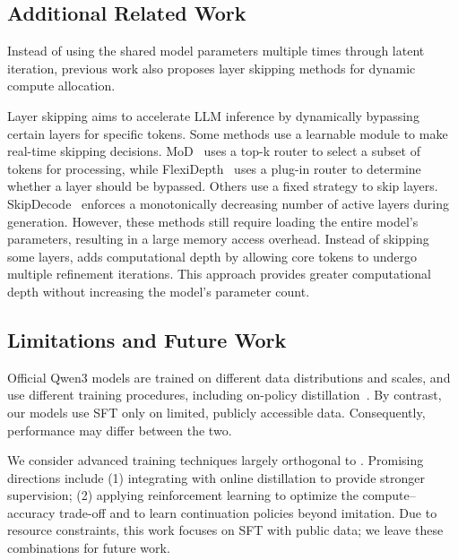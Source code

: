 \subsection{Additional Related Work}
Instead of using the shared model parameters multiple times through latent iteration, previous work also proposes layer skipping methods for dynamic compute allocation.

Layer skipping aims to accelerate LLM inference by dynamically bypassing certain layers for specific tokens.
Some methods use a learnable module to make real-time skipping decisions. MoD~\citep{raposo2024mixture} uses a top-k router to select a subset of tokens for processing, while FlexiDepth~\citep{luo2025adaptive} uses a plug-in router to determine whether a layer should be bypassed. Others use a fixed strategy to skip layers. SkipDecode~\citep{del2023skipdecode} enforces a monotonically decreasing number of active layers during generation.
However, these methods still require loading the entire model's parameters, resulting in a large memory access overhead.
Instead of skipping some layers, \name adds computational depth by allowing core tokens to undergo multiple refinement iterations.
This approach provides greater computational depth without increasing the model's parameter count.


\subsection{Limitations and Future Work}
Official Qwen3 models are trained on different data distributions and scales, and use different training procedures, including on-policy distillation~\citep{yang2025qwen3}. By contrast, our models use SFT only on limited, publicly accessible data. Consequently, performance may differ between the two.

We consider advanced training techniques largely orthogonal to \name. Promising directions include (1) integrating \name with online distillation to provide stronger supervision; (2) applying reinforcement learning to optimize the compute–accuracy trade-off and to learn continuation policies beyond imitation. Due to resource constraints, this work focuses on SFT with public data; we leave these combinations for future work.


